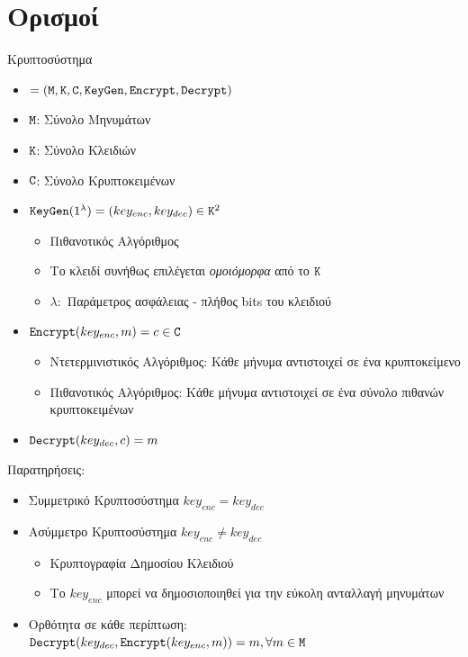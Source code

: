 \documentclass[handout]{beamer}
\begin{document}
\section{Ορισμοί}
\begin{frame}[allowframebreaks]{Κρυπτοσύστημα} 
\begin{itemize}
\item \cs$=(\mathtt{M}, \mathtt{K}, \mathtt{C}, \mathtt{KeyGen}, \mathtt{Encrypt}, \mathtt{Decrypt})$
\item $\mathtt{M}$: Σύνολο Μηνυμάτων
\item $\mathtt{K}$: Σύνολο Κλειδιών
\item $\mathtt{C}$: Σύνολο Κρυπτοκειμένων
\item $\mathtt{KeyGen}(1^\lambda) = (key_{enc},{key_{dec}}) \in \mathtt{K}^2$ 
\begin{itemize}
\item Πιθανοτικός Αλγόριθμος 
\item Το κλειδί συνήθως επιλέγεται \emph{ομοιόμορφα} από το $\mathtt{K}$
\item $\lambda:$ Παράμετρος ασφάλειας - πλήθος bits του κλειδιού
\end{itemize}
\item $\mathtt{Encrypt}(key_{enc},m) = c \in \mathtt{C}$
\begin{itemize}
\item Ντετερμινιστικός Αλγόριθμος: Κάθε μήνυμα αντιστοιχεί σε ένα κρυπτοκείμενο
\item Πιθανοτικός Αλγόριθμος: Κάθε μήνυμα αντιστοιχεί σε ένα σύνολο πιθανών κρυπτοκειμένων
\end{itemize}
\item $\mathtt{Decrypt}(key_{dec},c) = m$
\end{itemize}
\framebreak
Παρατηρήσεις:
\begin{itemize}
\item Συμμετρικό Κρυπτοσύστημα $key_{enc} = key_{dec}$
\item Ασύμμετρο Κρυπτοσύστημα $key_{enc} \neq key_{dec}$
\begin{itemize}
\item Κρυπτογραφία Δημοσίου Κλειδιού
\item Το $key_{enc}$ μπορεί να δημοσιοποιηθεί για την εύκολη ανταλλαγή μηνυμάτων
\end{itemize}
\item Ορθότητα σε κάθε περίπτωση: $\mathtt{Decrypt}(key_{dec}, \mathtt{Encrypt}(key_{enc}, m)) = m, \forall m \in \mathtt{M}$
\end{itemize}
\end{frame}
\end{document}
